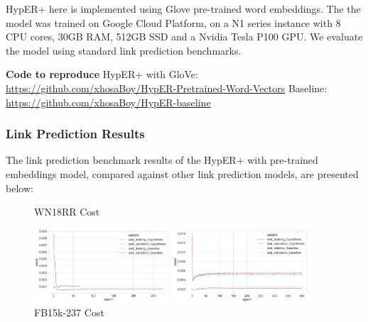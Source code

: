 HypER+ here is implemented using Glove pre-trained word embeddings. \newline
The the model was trained on Google Cloud Platform, on a N1 series instance with  8 CPU cores, 30GB RAM, 512GB SSD and a Nvidia Tesla P100 GPU. We evaluate the model using standard link prediction benchmarks. \newline 

\textbf{Code to reproduce} \newline
HypER+ with GloVe: \url{https://github.com/xhosaBoy/HypER-Pretrained-Word-Vectors} \newline
Baseline: \url{https://github.com/xhosaBoy/HypER-baseline} \newpage

\subsubsection{Link Prediction Results}
The link prediction benchmark results of the HypER+ with pre-trained embeddings model, compared against other link prediction models, are presented below:


\begin{figure}[H]
	\parbox{.5\linewidth}{
   		\caption{WN18RR Cost}
   		\centering
    		\includegraphics[width=0.45\textwidth, height=0.2\textheight]{WN18RR_Cost_Results}
		}
	\hfill
	\parbox{.5\linewidth}{
		\caption{FB15k-237 Cost}
   		\centering
		\includegraphics[width=0.45\textwidth, height=0.2\textheight]{FB15k-237_Cost_Results}
		}
\end{figure}

